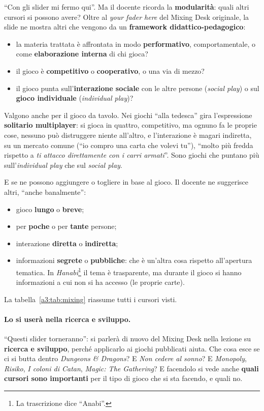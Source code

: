 ``Con gli slider mi fermo qui''. Ma il docente ricorda la \textbf{modularità}:
quali altri cursori si possono avere? Oltre al \emph{your fader here} del Mixing
Desk originale, la slide ne mostra altri che vengono da un \textbf{framework
didattico-pedagogico}:
\begin{itemize}
  \item la materia trattata è affrontata in modo \textbf{performativo},
        comportamentale, o come \textbf{elaborazione interna} di chi gioca?
  \item il gioco è \textbf{competitivo} o \textbf{cooperativo}, o una via di
        mezzo?
  \item il gioco punta sull'\textbf{interazione sociale} con le altre persone
        (\emph{social play}) o sul \textbf{gioco individuale}
        (\emph{individual play})?
\end{itemize}
Valgono anche per il gioco da tavolo. Nei giochi ``alla tedesca'' gira
l'espressione \textbf{solitario multiplayer}: si gioca in quattro, competitivo,
ma ognuno fa le proprie cose, nessuno può distruggere niente all'altro, e
l'interazione è magari indiretta, su un mercato comune (``io compro una carta che
volevi tu''), ``molto più fredda rispetto a \emph{ti attacco direttamente con i
carri armati}''. Sono giochi che puntano più sull'\emph{individual play} che sul
\emph{social play}.

E se ne possono aggiungere o togliere in base al gioco. Il docente ne suggerisce
altri, ``anche banalmente'':
\begin{itemize}
  \item gioco \textbf{lungo} o \textbf{breve};
  \item per \textbf{poche} o per \textbf{tante} persone;
  \item interazione \textbf{diretta} o \textbf{indiretta};
  \item informazioni \textbf{segrete} o \textbf{pubbliche}: che è un'altra cosa
        rispetto all'apertura tematica. In \emph{Hanabi}\footnote{La
        trascrizione dice ``Anabi''.} il tema è trasparente, ma durante il gioco
        si hanno informazioni a cui non si ha accesso (le proprie carte).
\end{itemize}
La tabella~\ref{a3:tab:mixing} riassume tutti i cursori visti.

\paragraph{Lo si userà nella ricerca e sviluppo.} ``Questi slider torneranno'':
si parlerà di nuovo del Mixing Desk nella lezione su \textbf{ricerca e
sviluppo}, perché applicarlo ai giochi pubblicati aiuta. Che cosa esce se ci si
butta dentro \emph{Dungeons \& Dragons}? E \emph{Non cedere al sonno}? E
\emph{Monopoly}, \emph{Risiko}, \emph{I coloni di Catan}, \emph{Magic: The
Gathering}? E facendolo si vede anche \textbf{quali cursori sono importanti} per
il tipo di gioco che si sta facendo, e quali no.

